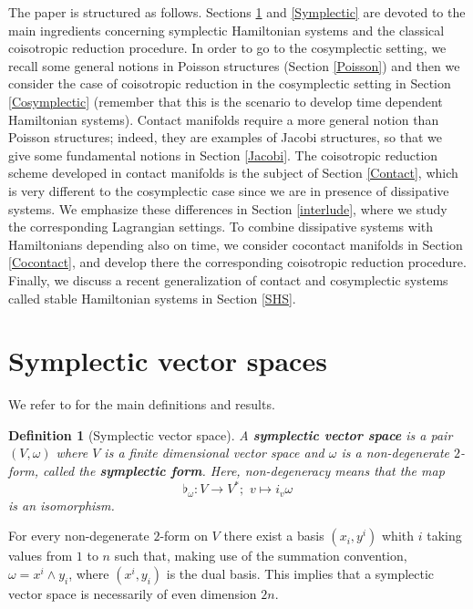 \documentclass[12pt]{article}
\newtheorem{Def}{Definition}[section]
\newcommand{\sectiontitle}{section}
\newcommand{\setsectiontitle}[1]{\renewcommand{\sectiontitle}{\footnotesize\textit{#1}}}
\begin{document}
The paper is structured as follows. Sections \ref{Symplecticvector} and \ref{Symplectic} are devoted to the main ingredients concerning symplectic Hamiltonian systems and the classical coisotropic reduction procedure. In order to go to the cosymplectic setting, we recall some general notions in Poisson structures (Section \ref{Poisson}) and then we consider the case of coisotropic reduction in the cosymplectic setting in Section \ref{Cosymplectic} (remember that this is the scenario to develop time dependent Hamiltonian systems). Contact manifolds require a more general notion than Poisson structures; indeed, they are examples of Jacobi structures, so that we give some fundamental notions in Section \ref{Jacobi}. The coisotropic reduction scheme developed in contact manifolds is the subject of Section \ref{Contact}, which is very different to the cosymplectic case since we are in presence of dissipative systems. We emphasize these differences in Section \ref{interlude}, where we study the corresponding Lagrangian settings. To combine dissipative systems with Hamiltonians depending also on time, we consider cocontact manifolds in Section \ref{Cocontact}, and develop there the corresponding coisotropic reduction procedure. Finally, we discuss a recent generalization of contact and cosymplectic systems called stable Hamiltonian systems in Section \ref{SHS}.


\section{Symplectic vector spaces} \label{Symplecticvector}

\setsectiontitle{SYMPLECTIC VECTOR SPACES}
We refer to \cites{abraham2008foundations, arnold, de2011methods, godbillon1969geometrie,libermann2012symplectic, vaisman2012lectures} for the main definitions and results.\\

\begin{Def}[Symplectic vector space] A \textbf{symplectic vector space} is a pair $(V, \omega)$ where $V$ is a finite dimensional vector space and $\omega$ is a non-degenerate $2$-form, called the \textbf{symplectic form}. Here, non-degeneracy means that the map $$ \flat_\omega: V \rightarrow V^*; \,\, v \mapsto i_v \omega$$ is an isomorphism.
\end{Def}

For every non-degenerate $2$-form
on $V$  there exist a basis $(x_i, y^i)$ whith $i$ taking values from $1$ to $n$ such that, making use of the summation convention, $\omega = x^i \wedge y_i$, where $(x^i, y_i)$ is the dual basis.
This implies that a symplectic vector space is necessarily of even dimension $2n$.\\
\end{document}
